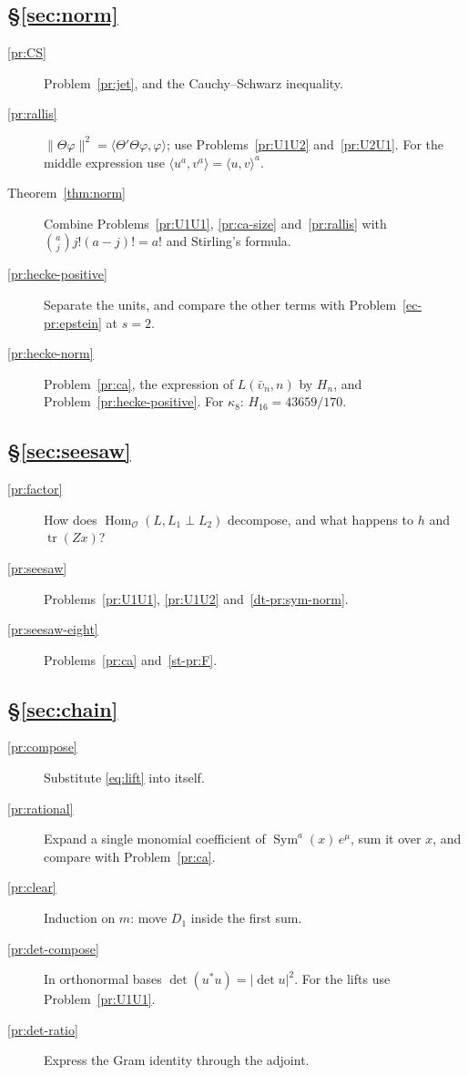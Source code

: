 \documentclass[reqno]{amsart}
\theoremstyle{definition}
\theoremstyle{plain}
\newcommand{\Oc}{\mathcal{O}}
\newcommand{\Hom}{\operatorname{Hom}}
\newcommand{\Sym}{\operatorname{Sym}}
\newcommand{\tr}{\operatorname{tr}}
\begin{document}
\subsection*{\S\ref{sec:norm}}
\begin{description}
\item[\ref{pr:CS}] Problem~\ref{pr:jet}, and the Cauchy--Schwarz inequality.
\item[\ref{pr:rallis}] \(\lVert\Theta\varphi\rVert^2 = \langle \Theta'\Theta\varphi, \varphi\rangle\); use Problems~\ref{pr:U1U2} and~\ref{pr:U2U1}.  For the middle expression use \(\langle u^a, v^a \rangle = \langle u, v\rangle^a\).
\item[Theorem~\ref{thm:norm}] Combine Problems~\ref{pr:U1U1}, \ref{pr:ca-size} and~\ref{pr:rallis} with \(\binom{a}{j}j!(a-j)!=a!\) and Stirling's formula.
\item[\ref{pr:hecke-positive}] Separate the units, and compare the other terms with Problem~\ref{ec-pr:epstein} at \(s = 2\).
\item[\ref{pr:hecke-norm}] Problem~\ref{pr:ca}, the expression of \(L(\bar\upsilon_n, n)\) by \(H_n\), and Problem~\ref{pr:hecke-positive}.  For \(\kappa_8\): \(H_{16} = 43659/170\).
\end{description}

\subsection*{\S\ref{sec:seesaw}}
\begin{description}
\item[\ref{pr:factor}] How does \(\Hom_\Oc(L, L_1 \perp L_2)\) decompose, and what happens to \(h\) and \(\tr(Zx)\)?
\item[\ref{pr:seesaw}] Problems~\ref{pr:U1U1}, \ref{pr:U1U2} and~\ref{dt-pr:sym-norm}.
\item[\ref{pr:seesaw-eight}] Problems~\ref{pr:ca} and~\ref{st-pr:F}.
\end{description}

\subsection*{\S\ref{sec:chain}}
\begin{description}
\item[\ref{pr:compose}] Substitute \eqref{eq:lift} into itself.
\item[\ref{pr:rational}] Expand a single monomial coefficient of \(\Sym^a(x)\, e^\mu\), sum it over \(x\), and compare with Problem~\ref{pr:ca}.
\item[\ref{pr:clear}] Induction on \(m\): move \(D_1\) inside the first sum.
\item[\ref{pr:det-compose}] In orthonormal bases \(\det(u^*u) = \lvert\det u\rvert^2\).  For the lifts use Problem~\ref{pr:U1U1}.
\item[\ref{pr:det-ratio}] Express the Gram identity through the adjoint.
\end{description}
\end{document}
